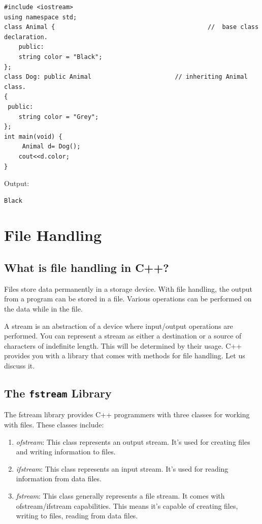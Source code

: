 \documentclass{book}
\begin{document}
\begin{lstlisting}
#include <iostream>    
using namespace std;    
class Animal {                                          //  base class declaration.  
    public:    
    string color = "Black";      
};     
class Dog: public Animal                       // inheriting Animal class.  
{      
 public:    
    string color = "Grey";      
};    
int main(void) {    
     Animal d= Dog();      
    cout<<d.color;     
}    
\end{lstlisting}

Output:

\begin{verbatim}
Black
\end{verbatim}

\chapter{File Handling}

\section{What is file handling in C++?}

Files store data permanently in a storage device. With file handling, the output from a program can be stored in a file. Various operations can be performed on the data while in the file.

A stream is an abstraction of a device where input/output operations are performed. You can represent a stream as either a destination or a source of characters of indefinite length. This will be determined by their usage. C++ provides you with a library that comes with methods for file handling. Let us discuss it.

\section{The \texttt{fstream} Library}

The fstream library provides C++ programmers with three classes for working with files. These classes include:

\begin{enumerate}
	\item \textit{ofstream}: This class represents an output stream. It’s used for creating files and writing information to files.
\item \textit{ifstream}: This class represents an input stream. It’s used for reading information from data files.
\item \textit{fstream}: This class generally represents a file stream. It comes with ofstream/ifstream capabilities. This means it’s capable of creating files, writing to files, reading from data files.

\end{enumerate}
\end{document}
